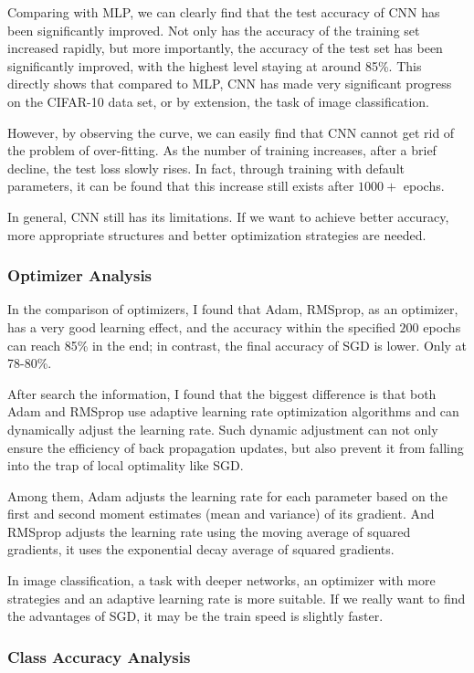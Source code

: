 \documentclass{article}
\begin{document}
Comparing with MLP, we can clearly find that the test accuracy of CNN has been significantly improved. Not only has the accuracy of the training set increased rapidly, but more importantly, the accuracy of the test set has been significantly improved, with the highest level staying at around 85\%. This directly shows that compared to MLP, CNN has made very significant progress on the CIFAR-10 data set, or by extension, the task of image classification.

However, by observing the curve, we can easily find that CNN cannot get rid of the problem of over-fitting. As the number of training increases, after a brief decline, the test loss slowly rises. In fact, through training with default parameters, it can be found that this increase still exists after $1000+$ epochs.

In general, CNN still has its limitations. If we want to achieve better accuracy, more appropriate structures and better optimization strategies are needed.

\subsubsection{Optimizer Analysis}

In the comparison of optimizers, I found that Adam, RMSprop, as an optimizer, has a very good learning effect, and the accuracy within the specified $200$ epochs can reach 85\% in the end; in contrast, the final accuracy of SGD is lower. Only at 78-80\%.

After search the information, I found that the biggest difference is that both Adam and RMSprop use adaptive learning rate optimization algorithms and can dynamically adjust the learning rate. Such dynamic adjustment can not only ensure the efficiency of back propagation updates, but also prevent it from falling into the trap of local optimality like SGD.

Among them, Adam adjusts the learning rate for each parameter based on the first and second moment estimates (mean and variance) of its gradient. And RMSprop adjusts the learning rate using the moving average of squared gradients, it uses the exponential decay average of squared gradients.

In image classification, a task with deeper networks, an optimizer with more strategies and an adaptive learning rate is more suitable. If we really want to find the advantages of SGD, it may be the train speed is slightly faster.

\subsubsection{Class Accuracy Analysis}
\end{document}

